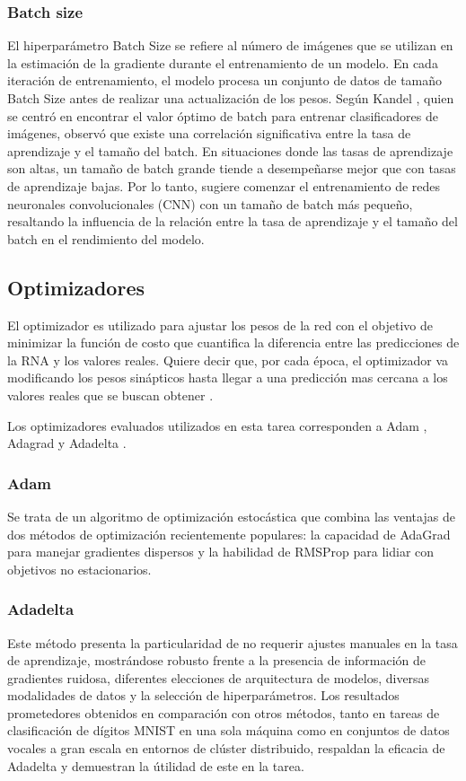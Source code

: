 \documentclass[journal]{IEEEtai}
\begin{document}
\subsubsection{\textbf{Batch size}}

El hiperparámetro Batch Size se refiere al número de imágenes que se utilizan en la estimación de la gradiente durante el entrenamiento de un modelo. En cada iteración de entrenamiento, el modelo procesa un conjunto de datos de tamaño Batch Size antes de realizar una actualización de los pesos. Según Kandel \cite{BatchSize}, quien se centró en encontrar el valor óptimo de batch para entrenar clasificadores de imágenes, observó que existe una correlación significativa entre la tasa de aprendizaje y el tamaño del batch. En situaciones donde las tasas de aprendizaje son altas, un tamaño de batch grande tiende a desempeñarse mejor que con tasas de aprendizaje bajas. Por lo tanto, sugiere comenzar el entrenamiento de redes neuronales convolucionales (CNN) con un tamaño de batch más pequeño, resaltando la influencia de la relación entre la tasa de aprendizaje y el tamaño del batch en el rendimiento del modelo.


\subsection{Optimizadores}

El optimizador es utilizado para ajustar los pesos de la red con el objetivo de minimizar la función de costo que cuantifica la diferencia entre las predicciones de la RNA y los valores reales. Quiere decir que, por cada época, el optimizador va modificando los pesos sinápticos hasta llegar a una predicción mas cercana a los valores reales que se buscan obtener \cite{Epocas}.

Los optimizadores evaluados utilizados en esta tarea corresponden a Adam \cite{Adam}, Adagrad \cite{Adagrad} y Adadelta \cite{Adadelta}.

\subsubsection{\textbf{Adam}} Se trata de un algoritmo de optimización estocástica que combina las ventajas de dos métodos de optimización recientemente populares: la capacidad de AdaGrad para manejar gradientes dispersos y la habilidad de RMSProp para lidiar con objetivos no estacionarios.

\subsubsection{\textbf{Adadelta}} Este método presenta la particularidad de no requerir ajustes manuales en la tasa de aprendizaje, mostrándose robusto frente a la presencia de información de gradientes ruidosa, diferentes elecciones de arquitectura de modelos, diversas modalidades de datos y la selección de hiperparámetros. Los resultados prometedores obtenidos en comparación con otros métodos, tanto en tareas de clasificación de dígitos MNIST en una sola máquina como en conjuntos de datos vocales a gran escala en entornos de clúster distribuido, respaldan la eficacia de Adadelta y demuestran la útilidad de este en la tarea.
\end{document}
